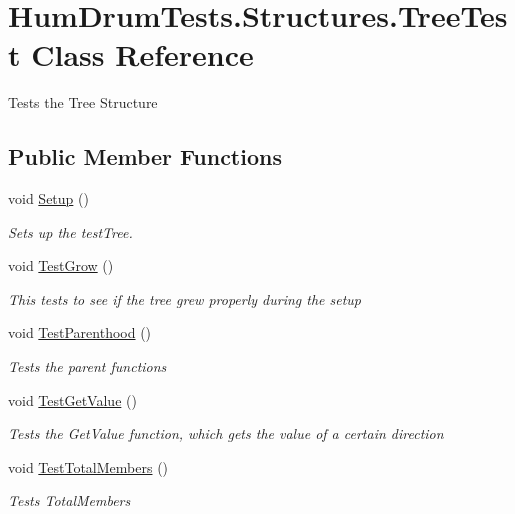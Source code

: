 \hypertarget{classHumDrumTests_1_1Structures_1_1TreeTest}{}\section{Hum\+Drum\+Tests.\+Structures.\+Tree\+Test Class Reference}
\label{classHumDrumTests_1_1Structures_1_1TreeTest}


Tests the Tree Structure  


\subsection*{Public Member Functions}
\begin{DoxyCompactItemize}
\item 
void \hyperlink{classHumDrumTests_1_1Structures_1_1TreeTest_ac0b5477885f67846277735176a604d82}{Setup} ()
\begin{DoxyCompactList}\small\item\em Sets up the test\+Tree. \end{DoxyCompactList}\item 
void \hyperlink{classHumDrumTests_1_1Structures_1_1TreeTest_afdec87a47b7461c6134121bee1af3e08}{Test\+Grow} ()
\begin{DoxyCompactList}\small\item\em This tests to see if the tree grew properly during the setup \end{DoxyCompactList}\item 
void \hyperlink{classHumDrumTests_1_1Structures_1_1TreeTest_aafdf77152f3bfd5438e71cbcd1b532f0}{Test\+Parenthood} ()
\begin{DoxyCompactList}\small\item\em Tests the parent functions \end{DoxyCompactList}\item 
void \hyperlink{classHumDrumTests_1_1Structures_1_1TreeTest_a6cbc2469b55e1d3ed0dd613a614f9181}{Test\+Get\+Value} ()
\begin{DoxyCompactList}\small\item\em Tests the Get\+Value function, which gets the value of a certain direction \end{DoxyCompactList}\item 
void \hyperlink{classHumDrumTests_1_1Structures_1_1TreeTest_a6a214b9b50ef199a5721224ee5bbd9fe}{Test\+Total\+Members} ()
\begin{DoxyCompactList}\small\item\em Tests Total\+Members \end{DoxyCompactList}\item 

\end{DoxyCompactItemize}
